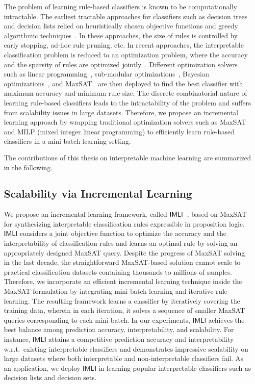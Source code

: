 The problem of learning rule-based classifiers is known to be computationally intractable. The earliest tractable approaches for classifiers such as decision trees and decision lists relied on heuristically chosen objective functions and greedy algorithmic techniques~\cite{ClarkN1989,CohenS1999,quinlan2014}. In these approaches, the size of rules is controlled by early stopping,  ad-hoc rule pruning, etc. In recent approaches, the interpretable classification problem is reduced to an optimization problem, where the accuracy and the sparsity of rules are optimized jointly~\cite{lakkaraju2016interpretable,narodytska2018learning}. Different optimization solvers such as linear programming~\cite{malioutov2013exact}, sub-modular optimizations~\cite{lakkaraju2016interpretable}, Bayesian optimizations~\cite{letham2015interpretable}, and MaxSAT~\cite{malioutov2018mlic} are then deployed to find the best classifier with maximum accuracy and minimum rule-size. The discrete combinatorial nature of learning rule-based classifiers leads to the intractability of the problem and suffers from scalability issues in large datasets. Therefore, we propose an incremental learning approach by wrapping traditional optimization solvers such as MaxSAT and MILP (mixed integer linear programming) to efficiently learn rule-based classifiers in a mini-batch learning setting. 

The contributions of this thesis on interpretable machine learning are summarized in the following.

\subsection*{Scalability via Incremental Learning}
We propose an incremental learning framework, called $ \mathsf{IMLI} $~\cite{GMM2022,GM2019},  based on MaxSAT for synthesizing interpretable classification rules expressible in proposition logic. $ \mathsf{IMLI} $ considers a joint objective function to optimize the accuracy and the interpretability of classification rules and learns an optimal rule by solving an appropriately designed MaxSAT query. Despite the progress of MaxSAT solving in the last decade, the straightforward MaxSAT-based solution cannot scale to practical classification datasets containing thousands to millions of samples. Therefore, we incorporate an efficient incremental learning technique inside the MaxSAT formulation by integrating mini-batch learning and iterative rule-learning. The resulting framework learns a classifier by iteratively covering the training data, wherein in each iteration, it solves a sequence of smaller MaxSAT queries corresponding to each mini-batch. In our experiments, $ \mathsf{IMLI} $ achieves the best balance among prediction accuracy, interpretability, and scalability. For instance, $ \mathsf{IMLI} $ attains a competitive prediction accuracy and interpretability w.r.t.\ existing interpretable classifiers and demonstrates impressive scalability on large datasets where both interpretable and non-interpretable classifiers fail. As an application, we deploy $ \mathsf{IMLI} $ in learning popular interpretable classifiers such as decision lists and decision sets.
	
